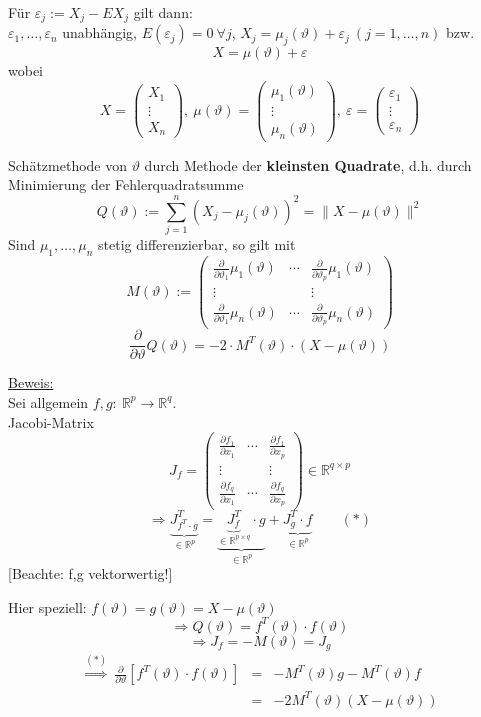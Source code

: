 \documentclass[a4paper,11pt,twoside,titlepage]{article}
\newcommand{\R}{{\mathbb R}}
\newcommand{\eps}{\varepsilon}
\begin{document}
Für $\varepsilon_j:=X_j-EX_j$ gilt dann:\\
$\eps_1,\ldots,\eps_n$ unabhängig, $E(\eps_j)=0\ \forall j$, $X_j=\mu_j(\vartheta)+\eps_j\ (j=1,\ldots,n)$ bzw. 
\[X=\mu(\vartheta)+\eps\]
wobei
\[X=\begin{pmatrix}X_1\\\vdots\\X_n\end{pmatrix},\ \mu(\vartheta)=\begin{pmatrix}\mu_1(\vartheta)\\\vdots\\\mu_n(\vartheta)\end{pmatrix},\ \eps=\begin{pmatrix}\eps_1\\\vdots\\\eps_n\end{pmatrix}\]

Schätzmethode von $\vartheta$ durch Methode der \textbf{kleinsten Quadrate}, d.h. durch Minimierung der Fehlerquadratsumme
\[Q(\vartheta):=\sum_{j=1}^n(X_j-\mu_j(\vartheta))^2=\|X-\mu(\vartheta)\|^2\]
Sind $\mu_1,\ldots,\mu_n$ stetig differenzierbar, so gilt mit
\[M(\vartheta):=\begin{pmatrix} \frac{\partial}{\partial\vartheta_1}\mu_1(\vartheta)&\cdots&\frac{\partial}{\partial\vartheta_p}\mu_1(\vartheta)\\
\vdots&&\vdots\\\frac{\partial}{\partial\vartheta_1}\mu_n(\vartheta)&\cdots&\frac{\partial}{\partial\vartheta_p}\mu_n(\vartheta)\end{pmatrix}\]
\[\frac{\partial}{\partial\vartheta}Q(\vartheta)=-2\cdot M^T(\vartheta)\cdot(X-\mu(\vartheta))\]

\underline{Beweis:}\\
Sei allgemein $f,g:\ \R^p\to\R^q$.\\
Jacobi-Matrix
\[J_f=\begin{pmatrix} \frac{\partial f_1}{\partial x_1}&\cdots&\frac{\partial f_1}{\partial x_p}\\
\vdots&&\vdots\\\frac{\partial f_q}{\partial x_1}&\cdots&\frac{\partial f_q}{\partial x_p}\end{pmatrix}\in\R^{q\times p}\]
\[\Rightarrow \underbrace{J_{f^T\cdot g}^T}_{\in\R^p}=\underbrace{\underbrace{J_f^T}_{\in\R^{p\times q}}\cdot g}_{\in\R^p}+\underbrace{J_g^T\cdot f}_{\in\R^p}\qquad(\ast)\]
[Beachte: f,g vektorwertig!]

Hier speziell: $f(\vartheta)=g(\vartheta)=X-\mu(\vartheta)$
\[\Rightarrow Q(\vartheta)=f^T(\vartheta)\cdot f(\vartheta)\]
\[\Rightarrow J_f=-M(\vartheta)=J_g\]
\begin{eqnarray*}
\stackrel{(\ast)}{\Rightarrow}\ \frac{\partial}{\partial\vartheta}[f^T(\vartheta)\cdot f(\vartheta)]&=&-M^T(\vartheta)g-M^T(\vartheta)f\\
&=&-2M^T(\vartheta)(X-\mu(\vartheta))\end{eqnarray*}
\end{document}
